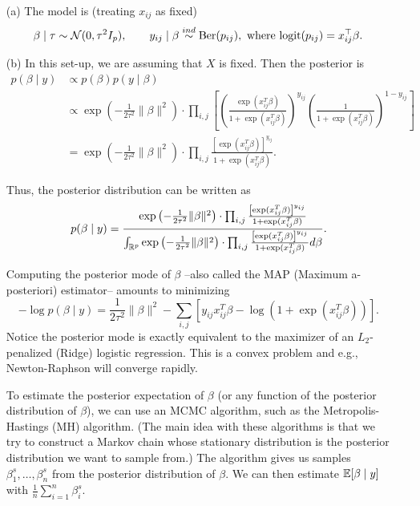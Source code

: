 \begin{enumerate}
\item[(a)] The model is (treating $x_{ij}$ as fixed)
\begin{equation}
\beta \mid \tau \sim {\mathcal N}(0, \tau^2 I_p), \qquad y_{ij} \mid \beta \stackrel{ind}{\sim} \text{Ber}(p_{ij}), \text{ where } \text{logit}(p_{ij}) = x_{ij}^\top\beta.
\end{equation}

\item[(b)] In this set-up, we are assuming that $X$ is fixed. Then the posterior is \begin{align*}
p(\beta \mid y) &\propto p(\beta) p (y \mid \beta) \\ 
&\propto \exp \left( - \frac{1}{2\tau^2} \|\beta\|^2 \right) \cdot \prod_{i,j} \left[\left( \frac{\exp (x_{ij}^T \beta)}{1 + \exp (x_{ij}^T \beta)} \right)^{y_{ij}} \left( \frac{1}{1 + \exp (x_{ij}^T \beta)} \right)^{1 - y_{ij}}\right] \\ 
&= \exp \left( - \frac{1}{2\tau^2} \|\beta\|^2 \right) \cdot \prod_{i,j} \frac{\left[\exp (x_{ij}^T \beta) \right]^{y_{ij}}}{1 + \exp (x_{ij}^T \beta)}.
\end{align*}

Thus, the posterior distribution can be written as
\begin{equation}\label{eq:posteriorBasketball}
p(\beta \mid y) = \frac{\exp \left( - \frac{1}{2\tau^2} \|\beta\|^2 \right) \cdot \prod_{i,j} \frac{\left[\exp (x_{ij}^T \beta) \right]^{y_{ij}}}{1 + \exp (x_{ij}^T \beta)}}{\int_{{\mathbb R}^p} \exp \left( - \frac{1}{2\tau^2} \|\beta\|^2 \right) \cdot \prod_{i,j} \frac{\left[\exp (x_{ij}^T \beta) \right]^{y_{ij}}}{1 + \exp (x_{ij}^T \beta)} d \beta}.
\end{equation}

Computing the posterior mode of $\beta$ --also called the MAP (Maximum a-posteriori) estimator-- amounts to minimizing 
\begin{equation}
\label{eq:posterior_median}
- \log p(\beta \mid y) = \frac{1}{2\tau^2} \|\beta\|^2 - \sum_{i,j} \left[ y_{ij} x_{ij}^T \beta - \log (1 + \exp(x_{ij}^T \beta)) \right].
\end{equation}
Notice the posterior mode is exactly equivalent to the maximizer of an $L_2$-penalized (Ridge) logistic regression. This is a convex problem and e.g., Newton-Raphson will converge rapidly.


To estimate the posterior expectation of $\beta$ (or any function of the posterior distribution of $\beta$), we can use an MCMC algorithm, such as the Metropolis-Hastings (MH) algorithm. (The main idea with these algorithms is that we try to construct a Markov chain whose stationary distribution is the posterior distribution we want to sample from.) The algorithm gives us samples $\beta_1^s, \dots, \beta_n^s$ from the posterior distribution of $\beta$. We can then estimate ${\mathbb E} [\beta \mid y]$ with $\frac{1}{n}\sum_{i=1}^n \beta_i^s$.


\end{enumerate}
